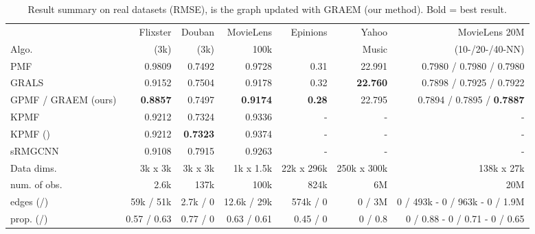\documentclass{article}
\theoremstyle{plain}
\theoremstyle{definition}
\theoremstyle{remark}
\begin{document}
\begin{table*}[h]

\caption{Result summary on real datasets (RMSE),  is the graph updated with GRAEM (our method). Bold = best result.}
\label{tab:RMSEsComputationalComplexity}
\begin{footnotesize}
\begin{sc}
\hskip-3.2cm\begin{tabular}{lrrrrrr}
\toprule
&  Flixster &Douban&MovieLens& Epinions & Yahoo & MovieLens 20M \\
Algo.  &  (3k) &  (3k) & 100k &  &  Music &  (10-/20-/40-NN)\\
\midrule
PMF & 0.9809 & 0.7492  & 0.9728 & 0.31& 22.991 & 0.7980 / 0.7980 / 0.7980\\
GRALS & 0.9152 & 0.7504  & 0.9178 & 0.32& \textbf{22.760} & 0.7898 / 0.7925 / 0.7922\\
GPMF / GRAEM (\scriptsize{ours}) & \textbf{0.8857} & 0.7497 & \textbf{0.9174} & \textbf{0.28} & 22.795 & 0.7894 / 0.7895 / \textbf{0.7887}\\
KPMF & 0.9212 & 0.7324 & 0.9336 & - & - & - \\
KPMF ()  & 0.9212 & \textbf{0.7323} & 0.9374 & - & - & - \\
sRMGCNN & 0.9108 & 0.7915  & 0.9263  & - & - & - \\
\midrule
Data dims. & \scriptsize{3k x 3k} & \scriptsize{3k x 3k}  & \scriptsize{1k x 1.5k}  & \scriptsize{22k x 296k} & \scriptsize{250k x 300k} & \scriptsize{138k x 27k} \\
num. of obs. &  2.6k & 137k &  100k & 824k & 6M & 20M \\
\midrule
 edges (/) & 59k / 51k & 2.7k / 0 & 12.6k / 29k  & 574k / 0 & 0 / 3M
 &  0 / 493k - 0 / 963k - 0 / 1.9M \\  
 \midrule
 prop. (/) & 0.57 / 0.63 & 0.77 / 0 & 0.63 / 0.61 & 0.45 / 0 & 0 / 0.8
 & 0 / 0.88 - 0 / 0.71 - 0 / 0.65 \\  
\bottomrule
\end{tabular}
\end{sc}
\end{footnotesize}
\end{table*}
\end{document}
